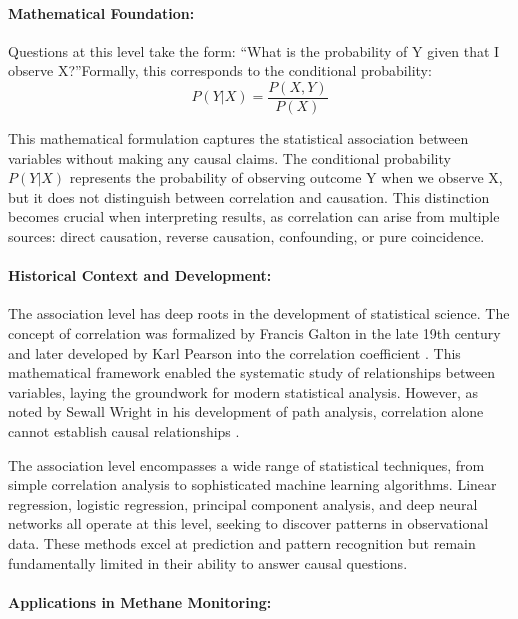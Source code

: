 \paragraph{Mathematical Foundation:}

Questions at this level take the form: \textquotedblleft What is the probability of Y given that I observe X?\textquotedblright Formally, this corresponds to the conditional probability:
\begin{equation}
	P(Y|X) = \frac{P(X,Y)}{P(X)}
\end{equation}

This mathematical formulation captures the statistical association between variables without making any causal claims. The conditional probability $P(Y|X)$ represents the probability of observing outcome Y when we observe X, but it does not distinguish between correlation and causation. This distinction becomes crucial when interpreting results, as correlation can arise from multiple sources: direct causation, reverse causation, confounding, or pure coincidence.

\paragraph{Historical Context and Development:}

The association level has deep roots in the development of statistical science. The concept of correlation was formalized by Francis Galton in the late 19th century and later developed by Karl Pearson into the correlation coefficient \cite{Pearl2009}. This mathematical framework enabled the systematic study of relationships between variables, laying the groundwork for modern statistical analysis. However, as noted by Sewall Wright in his development of path analysis, correlation alone cannot establish causal relationships \cite{Wright1921}.

The association level encompasses a wide range of statistical techniques, from simple correlation analysis to sophisticated machine learning algorithms. Linear regression, logistic regression, principal component analysis, and deep neural networks all operate at this level, seeking to discover patterns in observational data. These methods excel at prediction and pattern recognition but remain fundamentally limited in their ability to answer causal questions.

\paragraph{Applications in Methane Monitoring:}

